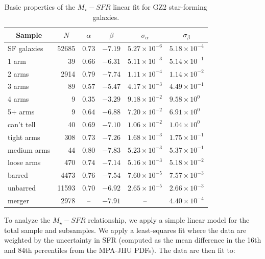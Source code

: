 \documentclass{emulateapj}
\begin{document}
\begin{table} \caption{Basic properties of the $M_\star-SFR$ linear fit for GZ2 star-forming galaxies.}
 \begin{tabular}{@{}lrcrcl}
 \hline
\multicolumn{1}{c}{Sample} &
\multicolumn{1}{c}{$N$} &
\multicolumn{1}{c}{$\alpha$} &
\multicolumn{1}{c}{$\beta$} &
\multicolumn{1}{c}{$\sigma_\alpha$} &
\multicolumn{1}{c}{$\sigma_\beta$} 
\\ 
\hline
\hline						
SF galaxies  & 52685   & $0.73$  & $-7.19$   & $5.27\times10^{-6}$  & $5.18\times10^{-4}$  \\
\hline
1 arm        & 39      & $0.66$  & $-6.31$  &  $5.11\times10^{-3}$  & $5.14\times10^{-1}$  \\
2 arms       & 2914    & $0.79$  & $-7.74$  &  $1.11\times10^{-4}$  & $1.14\times10^{-2}$  \\
3 arms       & 89      & $0.57$  & $-5.47$  &  $4.17\times10^{-3}$  & $4.49\times10^{-1}$  \\
4 arms       & 9       & $0.35$  & $-3.29$  &  $9.18\times10^{-2}$  & $9.58\times10^{0 }$  \\
5+ arms      & 9       & $0.64$  & $-6.88$  &  $7.20\times10^{-2}$  & $6.91\times10^{0 }$  \\
can't tell   & 40      & $0.69$  & $-7.10$  &  $1.06\times10^{-2}$  & $1.04\times10^{0 }$  \\
\hline
tight arms   &  308    & $0.73$  & $-7.26$  &  $1.68\times10^{-3}$  & $1.75\times10^{-1}$  \\
medium arms  &  44     & $0.80$  & $-7.83$  &  $5.23\times10^{-3}$  & $5.37\times10^{-1}$  \\
loose arms   &  470    & $0.74$  & $-7.14$  &  $5.16\times10^{-3}$  & $5.18\times10^{-2}$  \\
\hline
barred       &  4473   & $0.76$  & $-7.54$  &  $7.60\times10^{-5}$  & $7.57\times10^{-3}$  \\
unbarred     &  11593  & $0.70$  & $-6.92$  &  $2.65\times10^{-5}$  & $2.66\times10^{-3}$  \\
\hline
merger       &  2978   & --      & $-7.91$  &  --                   & $4.40\times10^{-4}$  \\
\hline
 \end{tabular}
\end{table}

To analyze the $M_\star-SFR$ relationship, we apply a simple linear model for the total sample and subsamples. We apply a least-squares fit where the data are weighted by the uncertainty in SFR (computed as the mean difference in the 16th and 84th percentiles from the MPA-JHU PDFs). The data are then fit to:
\end{document}
